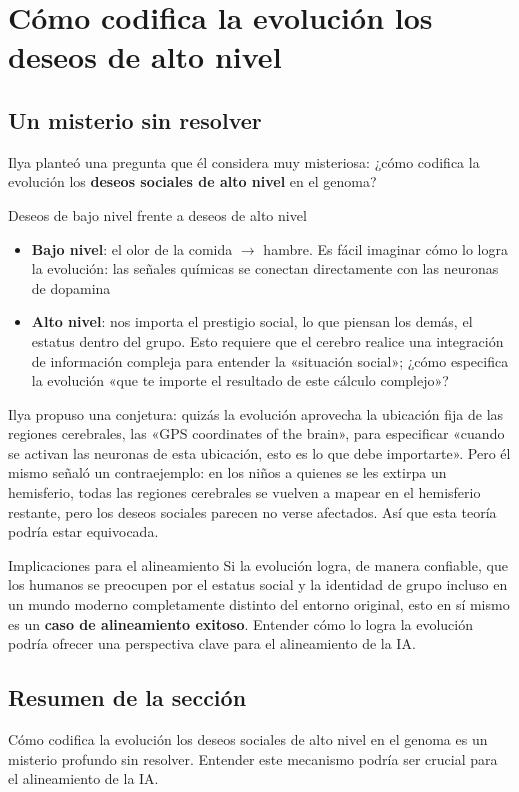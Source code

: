 \section{Cómo codifica la evolución los deseos de alto nivel}

\subsection{Un misterio sin resolver}

Ilya planteó una pregunta que él considera muy misteriosa: ¿cómo codifica la evolución los \textbf{deseos sociales de alto nivel} en el genoma?

\begin{knowledgebox}{Deseos de bajo nivel frente a deseos de alto nivel}
\begin{itemize}
    \item \textbf{Bajo nivel}: el olor de la comida $\rightarrow$ hambre. Es fácil imaginar cómo lo logra la evolución: las señales químicas se conectan directamente con las neuronas de dopamina
    \item \textbf{Alto nivel}: nos importa el prestigio social, lo que piensan los demás, el estatus dentro del grupo. Esto requiere que el cerebro realice una integración de información compleja para entender la «situación social»; ¿cómo especifica la evolución «que te importe el resultado de este cálculo complejo»?
\end{itemize}
\end{knowledgebox}

Ilya propuso una conjetura: quizás la evolución aprovecha la ubicación fija de las regiones cerebrales, las «GPS coordinates of the brain», para especificar «cuando se activan las neuronas de esta ubicación, esto es lo que debe importarte». Pero él mismo señaló un contraejemplo: en los niños a quienes se les extirpa un hemisferio, todas las regiones cerebrales se vuelven a mapear en el hemisferio restante, pero los deseos sociales parecen no verse afectados. Así que esta teoría podría estar equivocada.

\begin{importantbox}{Implicaciones para el alineamiento}
Si la evolución logra, de manera confiable, que los humanos se preocupen por el estatus social y la identidad de grupo incluso en un mundo moderno completamente distinto del entorno original, esto en sí mismo es un \textbf{caso de alineamiento exitoso}. Entender cómo lo logra la evolución podría ofrecer una perspectiva clave para el alineamiento de la IA.
\end{importantbox}

\subsection{Resumen de la sección}

Cómo codifica la evolución los deseos sociales de alto nivel en el genoma es un misterio profundo sin resolver. Entender este mecanismo podría ser crucial para el alineamiento de la IA.



